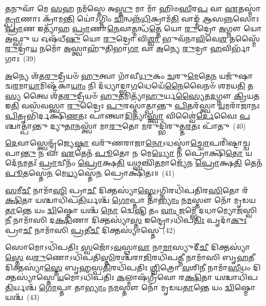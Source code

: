 \-\ul{𑌤}\-𑌨𑍁𑌵𑌾᳴ 𑌮𑍇 \ul{𑌸}\-𑌹 𑌨𑌮᳴𑌸𑍍𑌤𑍇 𑌅\-\ul{𑌸𑍍𑌤𑍁} 𑌮𑌾 𑌮𑌾᳴ 𑌹𑌿𑍞\-\ul{𑌸𑍀}\-𑌰\-\ul{𑌪} 𑌵𑌾 \ul{𑌏}\-𑌤𑌸𑍍𑌮𑌾॑\-\ul{𑌤𑍍𑌪𑍍𑌰𑌾}\-𑌣𑌾𑌃 𑌕𑍍𑌰𑌾᳴𑌮\-\ul{𑌨𑍍𑌤𑌿} 𑌯𑍋॑\-𑌽𑌗𑍍𑌨𑌿𑌂 \ul{𑌚𑌿}\-𑌨𑍍𑌵𑌨𑍍𑌨᳴\-\ul{𑌧𑌿}\-𑌕𑍍𑌰𑌾𑌮᳴\-\ul{𑌤𑌿} 𑌵𑌾𑌙𑍍𑌮᳴ \ul{𑌆}\-𑌸\-\ul{𑌨𑍍𑌨}\-𑌸𑍋𑌃 \ul{𑌪𑍍𑌰𑌾}\-𑌣 𑌇𑌤𑍍𑌯𑌾᳴𑌹 \ul{𑌪𑍍𑌰𑌾}\-𑌣𑌾\-\ul{𑌨𑍇}\-𑌵𑌾𑌤𑍍𑌮𑌨𑍍𑌧᳴\-\ul{𑌤𑍍𑌤𑍇} 𑌯𑍋 \ul{𑌰𑍁}\-𑌦𑍍𑌰𑍋 \ul{𑌅}\-𑌗𑍍𑌨𑍗 𑌯𑍋 \ul{𑌅}\-𑌫𑍍𑌸𑍁 𑌯 𑌓𑌷᳴𑌧𑍀\-\ul{𑌷𑍁} 𑌯𑍋 \ul{𑌰𑍁}\-𑌦𑍍𑌰𑍋 𑌵𑌿\-\ul{𑌶𑍍𑌵𑌾} 𑌭𑍁𑌵᳴𑌨𑌾\-\ul{𑌵𑌿}\-𑌵𑍇\-\ul{𑌶} 𑌤𑌸𑍍𑌮𑍈᳴ \ul{𑌰𑍁}\-𑌦𑍍𑌰𑌾\-\ul{𑌯} 𑌨𑌮𑍋᳴ \ul{𑌅}\-𑌸𑍍𑌤𑍍𑌵𑌾𑌹𑍁᳴𑌤𑌿𑌭𑌾\-\ul{𑌗𑌾} 𑌵𑌾 \ul{𑌅}\-𑌨𑍍𑌯𑍇 \ul{𑌰𑍁}\-𑌦𑍍𑌰𑌾 \ul{𑌹}\-𑌵𑌿𑌰𑍍𑌭𑌾᳴𑌗𑌾𑌃~(39)

\-\ul{𑌅}\-𑌨𑍍𑌯𑍇 𑌶᳴𑌤\-\ul{𑌰𑍁}\-𑌦𑍍𑌰𑍀𑌯𑍞᳴ \ul{𑌹𑍁}\-𑌤𑍍𑌵𑌾 𑌗𑌾᳴𑌵𑍀\-\ul{𑌧𑍁}\-𑌕𑌂 \ul{𑌚}\-𑌰𑍁\-\ul{𑌮𑍇}\-𑌤𑍇\-\ul{𑌨} 𑌯𑌜𑍁᳴𑌷𑌾 𑌚\-\ul{𑌰}\-𑌮𑌾\-\ul{𑌯𑌾}\-𑌮𑌿𑌷𑍍𑌟᳴𑌕𑌾\-\ul{𑌯𑌾𑌂} 𑌨𑌿 𑌦᳴𑌧𑍍𑌯𑌾𑌦𑍍𑌭𑌾\-\ul{𑌗}\-𑌧𑍇𑌯𑍇᳴\-\ul{𑌨𑍈}\-𑌵𑍈𑌨𑍞᳴ 𑌶𑌮𑌯\-\ul{𑌤𑌿} 𑌤\-\ul{𑌸𑍍𑌯} 𑌤𑍍𑌵𑍈 𑌶᳴𑌤\-\ul{𑌰𑍁}\-𑌦𑍍𑌰𑍀𑌯𑍞᳴ \ul{𑌹𑍁}\-𑌤𑌮𑌿𑌤𑍍𑌯𑌾᳴\-\ul{𑌹𑍁}\-𑌰𑍍𑌯\-\ul{𑌸𑍍𑌯𑍈}\-𑌤\-\ul{𑌦}\-𑌗𑍍𑌨𑍗 \ul{𑌕𑍍𑌰𑌿}\-𑌯\-\ul{𑌤} 𑌇\-\ul{𑌤𑌿} 𑌵𑌸᳴𑌵𑌸𑍍𑌤𑍍𑌵𑌾 \ul{𑌰𑍁}\-𑌦𑍍𑌰𑍈𑌃 \ul{𑌪𑍁}\-𑌰𑌸𑍍𑌤𑌾॑𑌤𑍍𑌪𑌾𑌨𑍍𑌤𑍁 \ul{𑌪𑌿}\-𑌤𑌰᳴𑌸𑍍𑌤𑍍𑌵𑌾 \ul{𑌯}\-𑌮𑌰𑌾᳴𑌜𑌾𑌨𑌃 \ul{𑌪𑌿}\-𑌤𑍃𑌭𑌿᳴𑌰𑍍𑌦𑌕𑍍𑌷𑌿\-\ul{𑌣}\-𑌤𑌃 𑌪𑌾॑𑌨𑍍𑌤𑍍𑌵𑌾\-\ul{𑌦𑌿}\-𑌤𑍍𑌯𑌾\-\ul{𑌸𑍍𑌤𑍍𑌵𑌾} 𑌵𑌿𑌶𑍍𑌵𑍈॑\-\ul{𑌰𑍍𑌦𑍇}\-𑌵𑍈𑌃 \ul{𑌪}\-𑌶𑍍𑌚𑌾𑌤𑍍𑌪𑌾॑𑌨𑍍𑌤𑍁 𑌦𑍍𑌯𑍁\-\ul{𑌤𑌾}\-𑌨𑌸𑍍𑌤𑍍𑌵𑌾᳴ 𑌮𑌾\-\ul{𑌰𑍁}\-𑌤𑍋 \ul{𑌮}\-𑌰𑍁𑌦𑍍𑌭𑌿᳴𑌰𑍁𑌤𑍍𑌤\-\ul{𑌰}\-𑌤𑌃 𑌪𑌾᳴𑌤𑍁~(40)

\-\ul{𑌦𑍇}\-𑌵𑌾𑌸𑍍𑌤𑍍𑌵𑍇𑌨𑍍𑌦𑍍𑌰᳴𑌜𑍍𑌯𑍇\-\ul{𑌷𑍍𑌠𑌾} 𑌵𑌰𑍁᳴𑌣𑌰𑌾𑌜𑌾\-\ul{𑌨𑍋}\-\-𑌽𑌧𑌸𑍍𑌤𑌾॑\-\ul{𑌚𑍍𑌚𑍋}\-𑌪𑌰𑌿᳴𑌷𑍍𑌟𑌾𑌚𑍍𑌚 𑌪𑌾\-\ul{𑌨𑍍𑌤𑍁} 𑌨 𑌵𑌾 \ul{𑌏}\-𑌤𑍇𑌨᳴ \ul{𑌪𑍂}\-𑌤𑍋 𑌨 𑌮𑍇\-\ul{𑌧𑍍𑌯𑍋} 𑌨 𑌪𑍍𑌰𑍋𑌕𑍍𑌷𑌿᳴\-\ul{𑌤𑍋} 𑌯𑌦𑍇᳴\-\ul{𑌨}\-𑌮𑌤𑌃᳴ \ul{𑌪𑍍𑌰𑌾}\-𑌚𑍀𑌨𑌂᳴ \ul{𑌪𑍍𑌰𑍋}\-𑌕𑍍𑌷\-\ul{𑌤𑌿} 𑌯𑌥𑍍𑌸𑌞𑍍𑌚𑌿᳴\-\ul{𑌤}\-𑌮𑌾𑌜𑍍𑌯𑍇᳴𑌨 \ul{𑌪𑍍𑌰𑍋}\-𑌕𑍍𑌷\-\ul{𑌤𑌿} 𑌤𑍇𑌨᳴ \ul{𑌪𑍂}\-𑌤𑌸𑍍𑌤𑍇\-\ul{𑌨} 𑌮𑍇\-\ul{𑌧𑍍𑌯}\-𑌸𑍍𑌤𑍇\-\ul{𑌨} 𑌪𑍍𑌰𑍋𑌕𑍍𑌷𑌿᳴𑌤𑌃॥~(41)

{\anuvakamend[{\-\ul{𑌦𑍁}\-𑌧𑍍𑌰\-\ul{𑌸𑍍𑌤}\-𑌨𑍂𑌰𑍍\mbox{}\-\ul{𑌹}\-𑌵𑌿𑌰𑍍𑌭𑌾᳴𑌗𑌾𑌃 𑌪𑌾\-\ul{𑌤𑍁} 𑌦𑍍𑌵𑌾𑌤𑍍𑌰𑌿𑍞᳴𑌶𑌚𑍍𑌚}]}%

\-\ul{𑌸}\-𑌮𑍀\-\ul{𑌚𑍀} 𑌨𑌾𑌮𑌾᳴\-\ul{𑌸𑌿} 𑌪𑍍𑌰𑌾\-\ul{𑌚𑍀} 𑌦𑌿𑌕𑍍𑌤𑌸𑍍𑌯𑌾॑\-\ul{𑌸𑍍𑌤𑍇}\-\-𑌽𑌗𑍍𑌨𑌿𑌰𑌧𑌿᳴𑌪𑌤𑌿𑌰\-\ul{𑌸𑌿}\-𑌤𑍋 𑌰᳴\-\ul{𑌕𑍍𑌷𑌿}\-𑌤𑌾 𑌯𑌶𑍍𑌚𑌾𑌧𑌿᳴𑌪\-\ul{𑌤𑌿}\-𑌰𑍍𑌯𑌶𑍍𑌚᳴ \ul{𑌗𑍋}\-𑌪𑍍𑌤𑌾 𑌤𑌾\-\ul{𑌭𑍍𑌯𑌾𑌂} 𑌨\-\ul{𑌮}\-𑌸𑍍𑌤𑍗 𑌨𑍋᳴ 𑌮𑍃𑌡𑌯\-\ul{𑌤𑌾}\-𑌨𑍍𑌤𑍇 𑌯𑌂 \ul{𑌦𑍍𑌵𑌿}\-𑌷𑍍𑌮𑍋 𑌯𑌶𑍍𑌚᳴ \ul{𑌨𑍋} 𑌦𑍍𑌵𑍇\-\ul{𑌷𑍍𑌟𑌿} 𑌤𑌂 \ul{𑌵𑌾𑌂} 𑌜𑌮𑍍𑌭𑍇᳴ 𑌦𑌧𑌾𑌮𑍍𑌯𑍋\-\ul{𑌜}\-𑌸𑍍𑌵𑌿\-\ul{𑌨𑍀} 𑌨𑌾𑌮𑌾᳴𑌸𑌿 𑌦\-\ul{𑌕𑍍𑌷𑌿}\-𑌣𑌾 𑌦𑌿𑌕𑍍𑌤𑌸𑍍𑌯𑌾॑\-\ul{𑌸𑍍𑌤} 𑌇𑌨𑍍𑌦𑍍𑌰𑍋\-𑌽𑌧𑌿᳴𑌪\-\ul{𑌤𑌿𑌃} 𑌪𑍃𑌦𑌾᳴\-\ul{𑌕𑍁𑌃} 𑌪𑍍𑌰𑌾\-\ul{𑌚𑍀} 𑌨𑌾𑌮𑌾᳴𑌸𑌿 \ul{𑌪𑍍𑌰}\-𑌤𑍀\-\ul{𑌚𑍀} 𑌦𑌿𑌕𑍍𑌤𑌸𑍍𑌯𑌾॑𑌸𑍍𑌤𑍇~(42)

𑌸𑍋𑌮𑍋\-𑌽𑌧𑌿᳴𑌪𑌤𑌿𑌃 \ul{𑌸𑍍𑌵}\-𑌜𑍋᳴\-𑌽\-\ul{𑌵}\-𑌸𑍍𑌥𑌾\-\ul{𑌵𑌾} 𑌨𑌾\-\ul{𑌮𑌾}\-𑌸𑍍𑌯𑍁𑌦𑍀᳴\-\ul{𑌚𑍀} 𑌦𑌿𑌕𑍍𑌤𑌸𑍍𑌯𑌾॑\-\ul{𑌸𑍍𑌤𑍇} 𑌵\-\ul{𑌰𑍁}\-𑌣𑍋\-𑌽𑌧𑌿᳴𑌪𑌤𑌿\-\ul{𑌸𑍍𑌤𑌿}\-𑌰𑌶𑍍𑌚᳴𑌰𑌾\-\ul{𑌜𑌿}\-𑌰𑌧𑌿᳴𑌪\-\ul{𑌤𑍍𑌨𑍀} 𑌨𑌾𑌮𑌾᳴𑌸𑌿 𑌬𑍃\-\ul{𑌹}\-𑌤𑍀 𑌦𑌿𑌕𑍍𑌤𑌸𑍍𑌯𑌾॑\-\ul{𑌸𑍍𑌤𑍇} 𑌬𑍃\-\ul{𑌹}\-𑌸𑍍𑌪\-\ul{𑌤𑌿}\-𑌰𑌧𑌿᳴𑌪𑌤𑌿𑌃 \ul{𑌶𑍍𑌵𑌿}\-𑌤𑍍𑌰𑍋 \ul{𑌵}\-𑌶𑌿\-\ul{𑌨𑍀} 𑌨𑌾𑌮𑌾᳴\-\ul{𑌸𑍀}\-𑌯𑌂 𑌦𑌿𑌕𑍍𑌤𑌸𑍍𑌯𑌾॑𑌸𑍍𑌤𑍇 \ul{𑌯}\-𑌮𑍋\-𑌽𑌧𑌿᳴𑌪𑌤𑌿𑌃 \ul{𑌕}\-𑌲𑍍𑌮𑌾𑌷᳴𑌗𑍍𑌰𑍀𑌵𑍋 𑌰\-\ul{𑌕𑍍𑌷𑌿}\-𑌤𑌾 𑌯𑌶𑍍𑌚𑌾𑌧𑌿᳴𑌪\-\ul{𑌤𑌿}\-𑌰𑍍𑌯𑌶𑍍𑌚᳴ \ul{𑌗𑍋}\-𑌪𑍍𑌤𑌾 𑌤𑌾\-\ul{𑌭𑍍𑌯𑌾𑌂} 𑌨\-\ul{𑌮}\-𑌸𑍍𑌤𑍗 𑌨𑍋᳴ 𑌮𑍃𑌡𑌯\-\ul{𑌤𑌾}\-𑌨𑍍𑌤𑍇 𑌯𑌂 \ul{𑌦𑍍𑌵𑌿}\-𑌷𑍍𑌮𑍋 𑌯𑌶𑍍𑌚᳴~(43)

